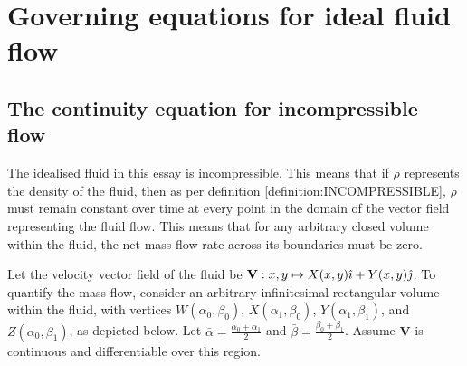 \section{Governing equations for ideal fluid flow}
\subsection{The continuity equation for incompressible flow}\label{section:CONTINUITY}
The idealised fluid in this essay is incompressible. This means that if $\rho$ represents the density of the fluid, then as per definition \ref{definition:INCOMPRESSIBLE}, $\rho$ must 
remain constant over time at every point in the domain of the vector field representing the fluid flow. This means that for any arbitrary closed volume within the fluid, the net mass
flow rate across its boundaries must be zero.

Let the velocity vector field of the fluid be $\mathbf{V}:x,y\mapsto X(x,y)\hat{\imath}+Y(x,y)\hat{\jmath}$. To quantify the mass flow, consider an arbitrary infinitesimal rectangular volume within
the fluid, with vertices $W(\alpha_0,\beta_0)$, $X(\alpha_1,\beta_0)$, $Y(\alpha_1,\beta_1)$, and $Z(\alpha_0,\beta_1)$, as depicted below. Let $\bar{\alpha}=\frac{\alpha_0+\alpha_1}{2}$
and $\bar{\beta}=\frac{\beta_0+\beta_1}{2}$. Assume $\mathbf{V}$ is continuous and differentiable over this region.

\begin{center}
\end{center}

